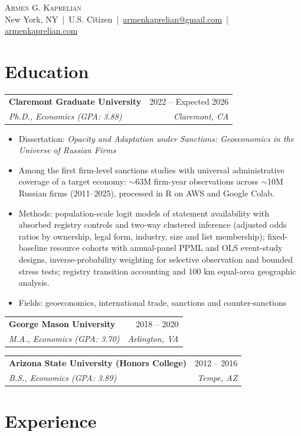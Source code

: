 \documentclass[10pt,letterpaper]{article}
\makeatletter
\newcommand{\entryspace}{3pt}         %
\newcommand{\entry}[4]{%
  \vspace{\entryspace}%
  \noindent\begin{tabularx}{\linewidth}{@{}X r@{}}
    \textbf{#1} & #2 \\
    \textit{#3} & \textit{#4} \\
  \end{tabularx}%
  \vspace{1pt}%
}
\makeatother
\begin{document}
\begin{center}
  {\LARGE\scshape\lsstyle Armen G. Kaprelian}\\[4pt]
  \small
  New York, NY
  \,\textcolor{rulegray}{|}\,
  U.S. Citizen
  \,\textcolor{rulegray}{|}\,
  \href{mailto:armenkaprelian@gmail.com}{armenkaprelian@gmail.com}
  \,\textcolor{rulegray}{|}\,
  \href{https://armenkaprelian.com}{armenkaprelian.com}
\end{center}
\vspace{2pt}

\section{Education}

\entry{Claremont Graduate University}{2022 -- Expected 2026}{Ph.D., Economics (GPA: 3.88)}{Claremont, CA}
\begin{itemize}
  \item Dissertation: \textit{Opacity and Adaptation under Sanctions: Geoeconomics in the Universe of Russian Firms}
  \item Among the first firm-level sanctions studies with universal administrative coverage of a target economy: $\sim$63M firm-year observations across $\sim$10M Russian firms (2011--2025), processed in R on AWS and Google Colab.
  \item Methods: population-scale logit models of statement availability with absorbed registry controls and two-way clustered inference (adjusted odds ratios by ownership, legal form, industry, size and list membership); fixed-baseline resource cohorts with annual-panel PPML and OLS event-study designs, inverse-probability weighting for selective observation and bounded stress tests; registry transition accounting and 100 km equal-area geographic analysis.
  \item Fields: geoeconomics, international trade, sanctions and counter-sanctions
\end{itemize}

\entry{George Mason University}{2018 -- 2020}{M.A., Economics (GPA: 3.70)}{Arlington, VA}

\entry{Arizona State University (Honors College)}{2012 -- 2016}{B.S., Economics (GPA: 3.89)}{Tempe, AZ}

\section{Experience}
\end{document}
